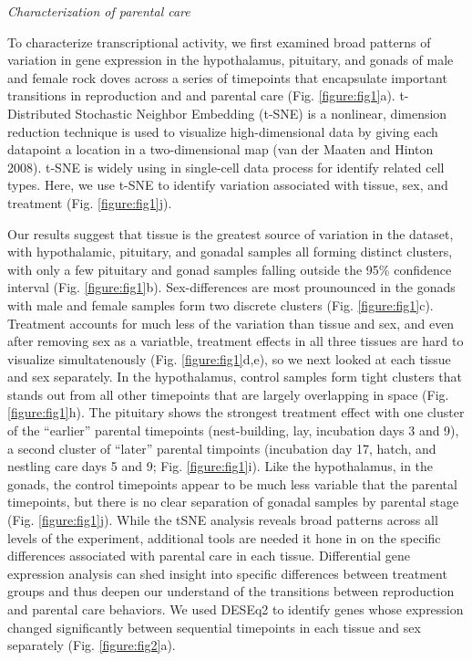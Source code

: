 \emph{Characterization of parental care}

To characterize transcriptional activity, we first examined broad
patterns of variation in gene expression in the hypothalamus, pituitary,
and gonads of male and female rock doves across a series of timepoints
that encapsulate important transitions in reproduction and and parental
care (Fig. \ref{figure:fig1}a). t-Distributed Stochastic Neighbor
Embedding (t-SNE) is a nonlinear, dimension reduction technique is used
to visualize high-dimensional data by giving each datapoint a location
in a two-dimensional map (van der Maaten and Hinton 2008). t-SNE is
widely using in single-cell data process for identify related cell
types. Here, we use t-SNE to identify variation associated with tissue,
sex, and treatment (Fig. \ref{figure:fig1}j).

Our results suggest that tissue is the greatest source of variation in
the dataset, with hypothalamic, pituitary, and gonadal samples all
forming distinct clusters, with only a few pituitary and gonad samples
falling outside the 95\% confidence interval (Fig. \ref{figure:fig1}b).
Sex-differences are most prounounced in the gonads with male and female
samples form two discrete clusters (Fig. \ref{figure:fig1}c). Treatment
accounts for much less of the variation than tissue and sex, and even
after removing sex as a variatble, treatment effects in all three
tissues are hard to visualize simultatenously (Fig.
\ref{figure:fig1}d,e), so we next looked at each tissue and sex
separately. In the hypothalamus, control samples form tight clusters
that stands out from all other timepoints that are largely overlapping
in space (Fig. \ref{figure:fig1}h). The pituitary shows the strongest
treatment effect with one cluster of the ``earlier'' parental timepoints
(nest-building, lay, incubation days 3 and 9), a second cluster of
``later'' parental timpoints (incubation day 17, hatch, and nestling
care days 5 and 9; Fig. \ref{figure:fig1}i). Like the hypothalamus, in
the gonads, the control timepoints appear to be much less variable that
the parental timepoints, but there is no clear separation of gonadal
samples by parental stage (Fig. \ref{figure:fig1}j). While the tSNE
analysis reveals broad patterns across all levels of the experiment,
additional tools are needed it hone in on the specific differences
associated with parental care in each tissue. Differential gene
expression analysis can shed insight into specific differences between
treatment groups and thus deepen our understand of the transitions
between reproduction and parental care behaviors. We used DESEq2 to
identify genes whose expression changed significantly between sequential
timepoints in each tissue and sex separately (Fig. \ref{figure:fig2}a).

